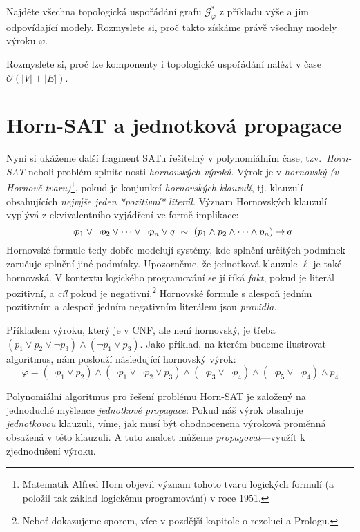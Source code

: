\begin{exercise}
    Najděte všechna topologická uspořádání grafu $\mathcal G_\varphi^\ast$ z příkladu výše a jim odpovídající modely. Rozmyslete si, proč takto získáme právě všechny modely výroku $\varphi$.
\end{exercise}

\begin{exercise}
    Rozmyslete si, proč lze komponenty i topologické uspořádání nalézt v čase $\mathcal O(|V|+|E|)$.
\end{exercise}

\section{Horn-SAT a jednotková propagace}\label{section:horn-sat}

Nyní si ukážeme další fragment SATu řešitelný v polynomiálním čase, tzv.\ \emph{Horn-SAT} neboli problém splnitelnosti \emph{hornovských výroků}. Výrok je v \emph{hornovský (v Hornově tvaru)}\footnote{Matematik Alfred Horn objevil význam tohoto tvaru logických formulí (a položil tak základ logickému programování) v roce 1951.}, pokud je konjunkcí \emph{hornovských klauzulí}, tj. klauzulí obsahujících \emph{nejvýše jeden *pozitivní* literál}. Význam Hornovských klauzulí vyplývá z ekvivalentního vyjádření ve formě implikace:
$$
\neg p_1\lor \neg p_2\lor \dots \lor \neg p_n\lor q\ \sim\ (p_1\land p_2\land\dots \land p_n)\mathbin{\rightarrow} q
$$
Hornovské formule tedy dobře modelují systémy, kde splnění určitých podmínek zaručuje splnění jiné podmínky. Upozorněme, že jednotková klauzule $\ell$ je také hornovská. V kontextu logického programování se jí říká \emph{fakt}, pokud je literál pozitivní, a \emph{cíl} pokud je negativní.\footnote{Neboť dokazujeme sporem, více v pozdější kapitole o rezoluci a Prologu.} Hornovské formule s alespoň jedním pozitivním a alespoň jedním negativním literálem jsou \emph{pravidla}. 

\begin{example}
    Příkladem výroku, který je v CNF, ale není hornovský, je třeba $(p_1\lor p_2\lor\neg p_3)\land (\neg p_1\lor p_3)$. Jako příklad, na kterém budeme ilustrovat algoritmus, nám poslouží následující hornovský výrok:
    $$
    \varphi=(\neg p_1\lor p_2)\land(\neg p_1\lor\neg p_2\lor p_3)\land(\neg p_3\lor\neg p_4)\land(\neg p_5\lor \neg p_4)\land p_4
    $$
\end{example}

Polynomiální algoritmus pro řešení problému Horn-SAT je založený na jednoduché myšlence \emph{jednotkové propagace}: Pokud náš výrok obsahuje \emph{jednotkovou} klauzuli, víme, jak musí být ohodnocenena výroková proměnná obsažená v této klauzuli. A tuto znalost můžeme \emph{propagovat}---využít k zjednodušení výroku. 

